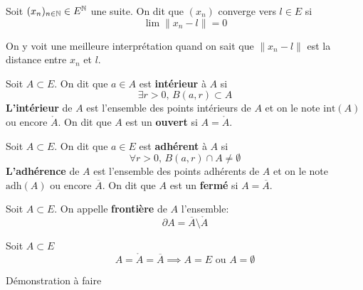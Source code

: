 \documentclass[a4paper, 12pt]{article}
\begin{document}
\begin{definition}
    Soit $(x_n)_{n \in \mathbb{N}} \in E^{\mathbb{N}}$ une suite.\n
    On dit que $(x_n)$ converge vers $l \in E$ si
    $$
    \lim \|x_n - l\| = 0
    $$
\end{definition}

\begin{remarque}
    On y voit une meilleure interprétation quand on sait que $\|x_n - l\|$ est la distance entre $x_n$ et $l$.
\end{remarque}

\begin{definition}[(intérieur)]
    Soit $A \subset E$.\n
    On dit que $a \in A$ est \textbf{intérieur} à $A$ si 
    $$
    \exists r \gt 0,\, B(a, r) \subset A
    $$
    \textbf{L'intérieur} de $A$ est l'ensemble des points intérieurs de $A$ et on le note $\text{int}(A)$ ou encore $\mathring{A}$.\n
    On dit que $A$ est un \textbf{ouvert} si $A = \mathring{A}$.
\end{definition}

\begin{definition}[(adhérence)]
    Soit $A \subset E$.\n
    On dit que $a \in E$ est \textbf{adhérent} à $A$ si 
    $$
    \forall r \gt 0,\, B(a, r) \cap A \neq \emptyset
    $$
    \textbf{L'adhérence} de $A$ est l'ensemble des points adhérents de $A$ et on le note $\text{adh}(A)$ ou encore $\overline{A}$.\n
    On dit que $A$ est un \textbf{fermé} si $A = \overline{A}$.
\end{definition}

\begin{definition}[(Frontière)]
    Soit $A \subset E$.\n
    On appelle \textbf{frontière} de $A$ l'ensemble:
    $$
    \partial A = \overline{A} \setminus \mathring{A}
    $$
\end{definition}

\begin{proposition}{}{}
    Soit $A \subset E$
    $$
    A = \mathring{A} = \overline{A} \implies A = E \text{ ou } A = \emptyset
    $$
\end{proposition}

\begin{hotwarn}
    Démonstration à faire
\end{hotwarn}
\end{document}

